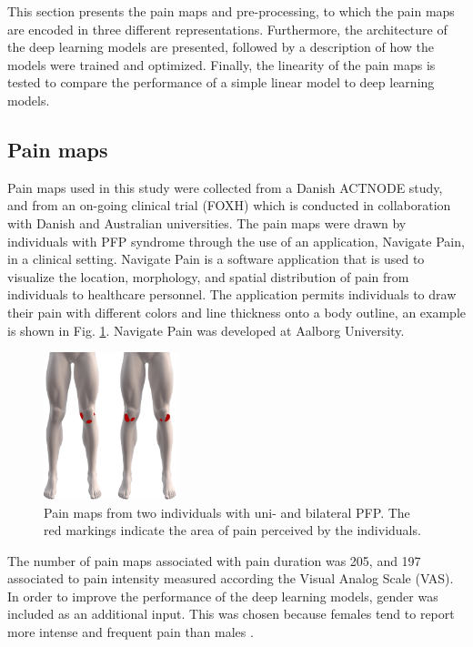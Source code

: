 This section presents the pain maps and pre-processing, to which the pain maps are encoded in three different representations. Furthermore, the architecture of the deep learning models are presented, followed by a description of how the models were trained and optimized. Finally, the linearity of the pain maps is tested to compare the performance of a simple linear model to deep learning models.

\subsection{Pain maps}
Pain maps used in this study were collected from a Danish ACTNODE study, and from an on-going clinical trial (FOXH) which is conducted in collaboration with Danish and Australian universities. The pain maps were drawn by individuals with PFP syndrome through the use of an application, Navigate Pain, in a clinical setting. \newline
\noindent
Navigate Pain is a software application that is used to visualize the location, morphology, and spatial distribution of pain from individuals to healthcare personnel. The application permits individuals to draw their pain with different colors and line thickness onto a body outline, an example is shown in Fig. \ref{fig:twoPainmaps}. Navigate Pain was developed at Aalborg University.\citep{Solutions2015}

\begin{figure}[H]
\centering
\includegraphics[width=0.35\textwidth]{Figures/twoPainmaps}
\caption{Pain maps from two individuals with uni- and bilateral PFP. The red markings indicate the area of pain perceived by the individuals.}
\label{fig:twoPainmaps}
\end{figure}

\noindent
The number of pain maps associated with pain duration was 205, and 197 associated to pain intensity measured according the Visual Analog Scale (VAS).
In order to improve the performance of the deep learning models, gender was included as an additional input. This was chosen because females tend to report more intense and frequent pain than males \citep{Pieh2012}. 

